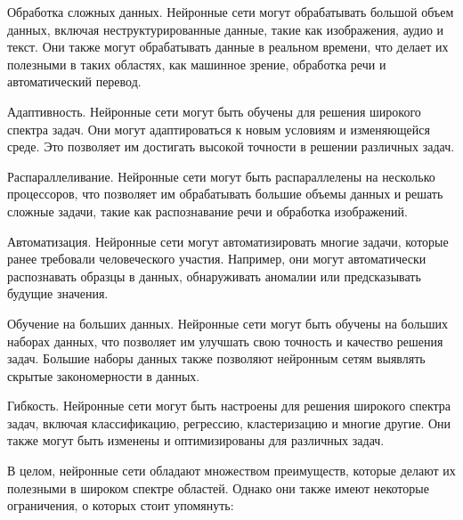 \begin{enumerate_num}
    \item Обработка сложных данных. Нейронные сети могут обрабатывать большой объем данных, включая неструктурированные данные, такие как изображения, аудио и текст. Они также могут обрабатывать данные в реальном времени, что делает их полезными в таких областях, как машинное зрение, обработка речи и автоматический перевод.
    \item Адаптивность. Нейронные сети могут быть обучены для решения широкого спектра задач. Они могут адаптироваться к новым условиям и изменяющейся среде. Это позволяет им достигать высокой точности в решении различных задач.
    \item Распараллеливание. Нейронные сети могут быть распараллелены на несколько процессоров, что позволяет им обрабатывать большие объемы данных и решать сложные задачи, такие как распознавание речи и обработка изображений.
    \item Автоматизация. Нейронные сети могут автоматизировать многие задачи, которые ранее требовали человеческого участия. Например, они могут автоматически распознавать образцы в данных, обнаруживать аномалии или предсказывать будущие значения.
    \item Обучение на больших данных. Нейронные сети могут быть обучены на больших наборах данных, что позволяет им улучшать свою точность и качество решения задач. Большие наборы данных также позволяют нейронным сетям выявлять скрытые закономерности в данных.
    \item Гибкость. Нейронные сети могут быть настроены для решения широкого спектра задач, включая классификацию, регрессию, кластеризацию и многие другие. Они также могут быть изменены и оптимизированы для различных задач.
\end{enumerate_num}

В целом, нейронные сети обладают множеством преимуществ, которые делают их полезными в широком спектре областей. Однако они также имеют некоторые ограничения, о которых стоит упомянуть:

